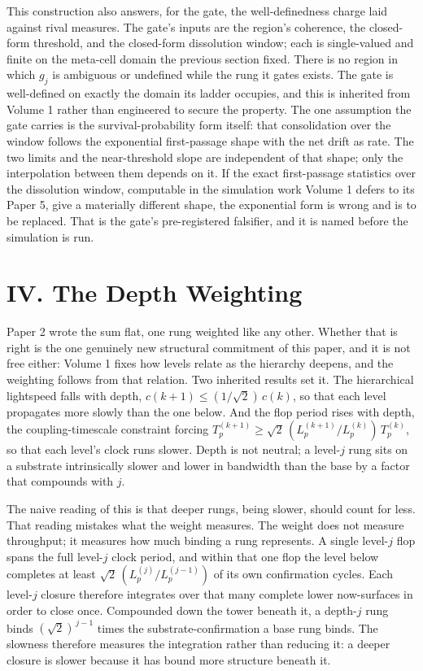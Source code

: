 \documentclass[11pt,oneside]{report}
\theoremstyle{definition}
\theoremstyle{remark}
\begin{document}
This construction also answers, for the gate, the well-definedness charge laid
against rival measures. The gate's inputs are the region's coherence, the
closed-form threshold, and the closed-form dissolution window; each is
single-valued and finite on the meta-cell domain the previous section fixed.
There is no region in which \ensuremath{g_{j}} is ambiguous or undefined while
the rung it gates exists. The gate is well-defined on exactly the domain its
ladder occupies, and this is inherited from Volume 1 rather than engineered to
secure the property. The one assumption the gate carries is the
survival-probability form itself: that consolidation over the window follows
the exponential first-passage shape with the net drift as rate. The two limits
and the near-threshold slope are independent of that shape; only the
interpolation between them depends on it. If the exact first-passage statistics
over the dissolution window, computable in the simulation work Volume 1 defers
to its Paper 5, give a materially different shape, the exponential form is
wrong and is to be replaced. That is the gate's pre-registered falsifier, and
it is named before the simulation is run.

\section*{IV. The Depth Weighting}

Paper 2 wrote the sum flat, one rung weighted like any other. Whether that is
right is the one genuinely new structural commitment of this paper, and it is
not free either: Volume 1 fixes how levels relate as the hierarchy deepens,
and the weighting follows from that relation. Two inherited results set it. The
hierarchical lightspeed falls with depth, \ensuremath{c(k+1) \le (1/\sqrt{2})\,c(k)},
so that each level propagates more slowly than the one below. And the flop
period rises with depth, the coupling-timescale constraint forcing
\ensuremath{T_{p}^{(k+1)} \ge \sqrt{2}\,(L_{p}^{(k+1)}/L_{p}^{(k)})\,T_{p}^{(k)}},
so that each level's clock runs slower. Depth is not neutral; a level-\ensuremath{j}
rung sits on a substrate intrinsically slower and lower in bandwidth than the
base by a factor that compounds with \ensuremath{j}.

The naive reading of this is that deeper rungs, being slower, should count for
less. That reading mistakes what the weight measures. The weight does not
measure throughput; it measures how much binding a rung represents. A single
level-\ensuremath{j} flop spans the full level-\ensuremath{j} clock period, and
within that one flop the level below completes at least
\ensuremath{\sqrt{2}\,(L_{p}^{(j)}/L_{p}^{(j-1)})} of its own confirmation
cycles. Each level-\ensuremath{j} closure therefore integrates over that many
complete lower now-surfaces in order to close once. Compounded down the tower
beneath it, a depth-\ensuremath{j} rung binds \ensuremath{(\sqrt{2})^{\,j-1}}
times the substrate-confirmation a base rung binds. The slowness therefore
measures the integration rather than reducing it: a deeper closure is slower
because it has bound more structure beneath it.
\end{document}
